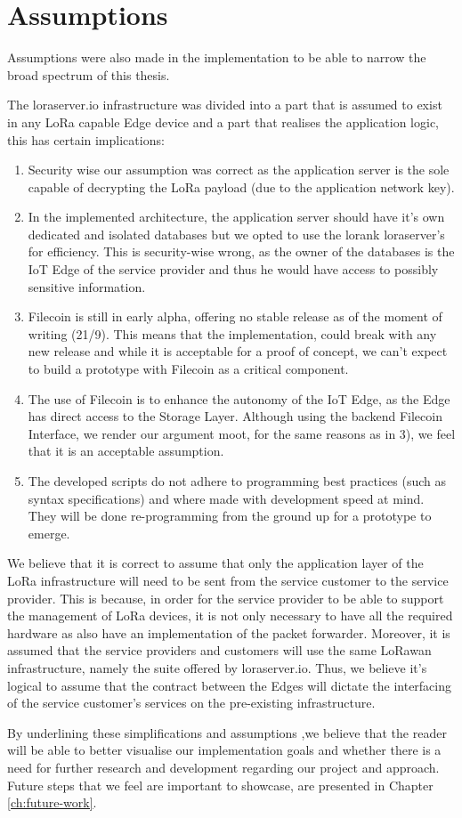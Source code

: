 \section{Assumptions}

Assumptions were also made in the implementation to be able to narrow the broad spectrum of this thesis.

The loraserver.io infrastructure was divided into a part that is assumed to exist in any LoRa capable Edge device and a part that realises the application logic, this has certain implications:

\begin{enumerate}
    \item Security wise our assumption was correct as the application server is the sole capable of decrypting the LoRa payload (due to the application network key). 
    \item In the implemented architecture, the application server should have it’s own dedicated and isolated databases but we opted to use the lorank loraserver’s for efficiency. This is security-wise wrong, as the owner of the databases is the IoT Edge of the service provider and thus he would have access to possibly sensitive information.
    \item Filecoin is still in early alpha, offering no stable release as of the moment of writing (21/9). This means that the implementation, could break with any new release and while it is acceptable for a proof of concept, we can’t expect to build a prototype with Filecoin as a critical component.
    \item The use of Filecoin is to enhance the autonomy of the IoT Edge, as the Edge has direct access to the Storage Layer. Although using the backend Filecoin Interface, we render our argument moot, for the same reasons as in 3), we feel that it is an acceptable assumption.
    \item The developed scripts do not adhere to programming best practices (such as syntax specifications) and where made with development speed at mind. They will be done re-programming from the ground up for a prototype to emerge.
\end{enumerate}

We believe that it is correct to assume that only the application layer of the LoRa infrastructure will need to be sent from the service customer to the service provider. This is because, in order for the service provider to be able to support the management of LoRa devices, it is not only necessary to have all the required hardware as also have an implementation of the packet forwarder. Moreover, it is assumed that the service providers and customers will use the same LoRawan infrastructure, namely the suite offered by loraserver.io. Thus, we believe it’s logical to assume that the contract between the Edges will dictate the interfacing of the service customer's services on the pre-existing infrastructure.

By underlining these simplifications and assumptions ,we believe that the reader will be able to better visualise our implementation goals and whether there is a need for further research and development regarding our project and approach. Future steps that we feel are important to showcase, are presented in Chapter \ref{ch:future-work}.
